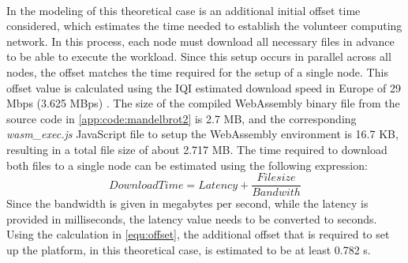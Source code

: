 ~\\
In the modeling of this theoretical case is an additional initial offset time considered, which estimates the time needed to establish the volunteer computing network. In this process, each node must download all necessary files in advance to be able to execute the workload. Since this setup occurs in parallel across all nodes, the offset matches the time required for the setup of a single node. This offset value is calculated using the \ac{IQI} estimated download speed in Europe of 29 Mbps (3.625 MBps) \cite{backend:latency}. The size of the compiled WebAssembly binary file from the source code in \autoref{app:code:mandelbrot2} is 2.7 MB, and the corresponding \emph{wasm\_exec.js} JavaScript file to setup the WebAssembly environment is 16.7 KB, resulting in a total file size of about 2.717 MB. The time required to download both files to a single node can be estimated using the following expression:
\begin{equation}
  DownloadTime = Latency + \frac{Filesize}{Bandwith} 
  \label{equ:offset}
\end{equation}
Since the bandwidth is given in megabytes per second, while the latency is provided in milliseconds, the latency value needs to be converted to seconds. Using the calculation in \eqref{equ:offset}, the additional offset that is required to set up the platform, in this theoretical case, is estimated to be at least 0.782 s.

